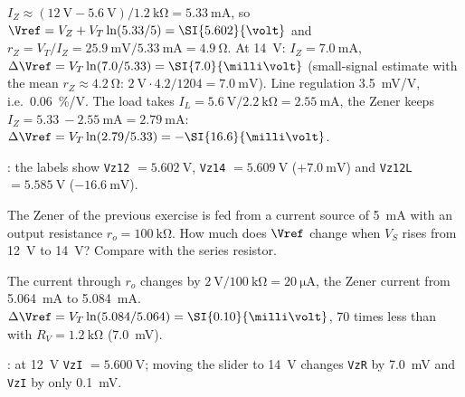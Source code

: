 \begin{solution}
\begin{talist}
\ta $I_Z \approx (\SI{12}{\volt}-\SI{5.6}{\volt})/\SI{1.2}{\kilo\ohm} = \SI{5.33}{\milli\ampere}$,
	so $\Vref = V_Z + V_T\ln(5.33/5) = \SI{5.602}{\volt}$ and
	$r_Z = V_T/I_Z = \SI{25.9}{\milli\volt}/\SI{5.33}{\milli\ampere} = \SI{4.9}{\ohm}$.
\ta At \SI{14}{\volt}: $I_Z = \SI{7.0}{\milli\ampere}$,
	$\Delta\Vref = V_T \ln(7.0/5.33) = \SI{7.0}{\milli\volt}$
	(small-signal estimate with the mean $r_Z \approx \SI{4.2}{\ohm}$:
	$\SI{2}{\volt}\cdot 4.2/1204 = \SI{7.0}{\milli\volt}$).
	Line regulation \SI{3.5}{\milli\volt/\volt}, i.e.\ \SI{0.06}{\percent/\volt}.
\ta The load takes $I_L = \SI{5.6}{\volt}/\SI{2.2}{\kilo\ohm} = \SI{2.55}{\milli\ampere}$,
	the Zener keeps $I_Z = \SI{5.33}{}-\SI{2.55}{\milli\ampere} = \SI{2.79}{\milli\ampere}$:
	$\Delta\Vref = V_T\ln(2.79/5.33) = -\SI{16.6}{\milli\volt}$.
\item[] : the labels show \texttt{Vz12} $=\SI{5.602}{\volt}$,
	\texttt{Vz14} $=\SI{5.609}{\volt}$ ($+\SI{7.0}{\milli\volt}$) and
	\texttt{Vz12L} $=\SI{5.585}{\volt}$ ($-\SI{16.6}{\milli\volt}$).
\end{talist}
\end{solution}

The Zener of the previous exercise is fed from a current source of
\SI{5}{\milli\ampere} with an output resistance $r_o=\SI{100}{\kilo\ohm}$.
How much does $\Vref$ change when $V_S$ rises from \SI{12}{\volt} to
\SI{14}{\volt}? Compare with the series resistor.

\begin{solution}
\begin{talist}
\ta The current through $r_o$ changes by $\SI{2}{\volt}/\SI{100}{\kilo\ohm} = \SI{20}{\micro\ampere}$,
	the Zener current from \SI{5.064}{\milli\ampere} to \SI{5.084}{\milli\ampere}.
	$\Delta\Vref = V_T\ln(5.084/5.064) = \SI{0.10}{\milli\volt}$,
	70 times less than with $R_V = \SI{1.2}{\kilo\ohm}$ (\SI{7.0}{\milli\volt}).
\item[] : at \SI{12}{\volt} \texttt{VzI} $=\SI{5.600}{\volt}$;
	moving the slider to \SI{14}{\volt} changes \texttt{VzR} by \SI{7.0}{\milli\volt}
	and \texttt{VzI} by only \SI{0.1}{\milli\volt}.
\end{talist}
\end{solution}

